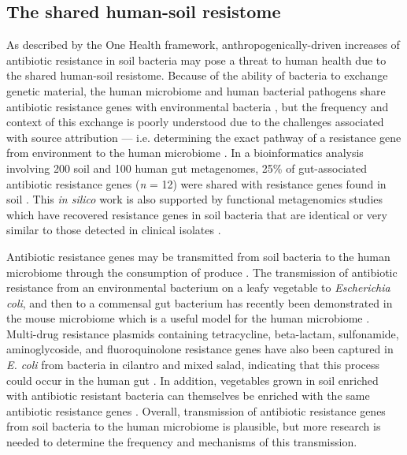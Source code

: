 \subsection{The shared human-soil resistome}

As described by the One Health framework, anthropogenically-driven increases of antibiotic resistance in soil bacteria may pose a threat to human health due to the shared human-soil resistome.
Because of the ability of bacteria to exchange genetic material, the human microbiome and human bacterial pathogens share antibiotic resistance genes with environmental bacteria \parencite{Forsberg.2012, Smillie.2011, Pal.2016}, but the frequency and context of this exchange is poorly understood due to the challenges associated with source attribution \parencite{Berendonk.2015, Huijbers.2015} --- i.e. determining the exact pathway of a resistance gene from environment to the human microbiome \parencite{Tiedje.2019, Li.2018}.
In a bioinformatics analysis involving 200 soil and 100 human gut metagenomes, 25\% of gut-associated antibiotic resistance genes (\textit{n} = 12) were shared with resistance genes found in soil \parencite{Pal.2016}.
This \textit{in silico} work is also supported by functional metagenomics studies which have recovered resistance genes in soil bacteria that are identical or very similar to those detected in clinical isolates \parencite{Forsberg.2012, Lau.2017b, Allen.2009}.

Antibiotic resistance genes may be transmitted from soil bacteria to the human microbiome through the consumption of produce \parencite{Maeusli.2020, Blau.2018}.
The transmission of antibiotic resistance from an environmental bacterium on a leafy vegetable to \textit{Escherichia coli}, and then to a commensal gut bacterium has recently been demonstrated in the mouse microbiome which is a useful model for the human microbiome \parencite{Maeusli.2020, Krych.2013}.
Multi-drug resistance plasmids containing tetracycline, beta-lactam, sulfonamide, aminoglycoside, and fluoroquinolone resistance genes have also been captured in \textit{E. coli} from bacteria in cilantro and mixed salad, indicating that this process could occur in the human gut \parencite{Blau.2018}.
In addition, vegetables grown in soil enriched with antibiotic resistant bacteria can themselves be enriched with the same antibiotic resistance genes \parencite{Murray.2019, Rahube.2016, Rahube.2014}.
Overall, transmission of antibiotic resistance genes from soil bacteria to the human microbiome is plausible, but more research is needed to determine the frequency and mechanisms of this transmission.


